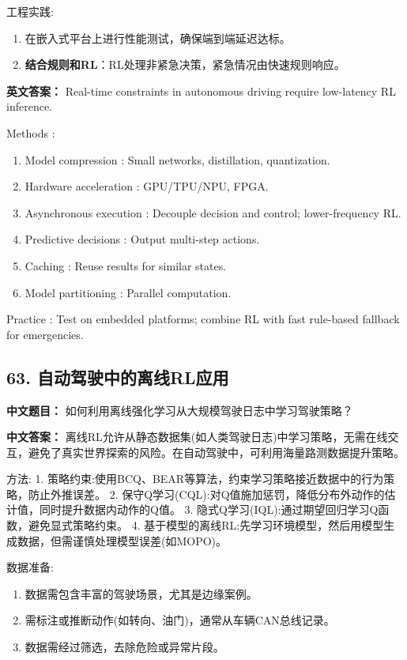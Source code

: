 \documentclass[10pt,a4paper]{ctexart}
\begin{document}
 工程实践:
\begin{enumerate}
    \item 在嵌入式平台上进行性能测试，确保端到端延迟达标。
    \item \textbf{结合规则和RL}：RL处理非紧急决策，紧急情况由快速规则响应。
\end{enumerate}

\textbf{英文答案：}  
Real-time constraints in autonomous driving require low-latency RL inference.

 Methods :
\begin{enumerate}
    \item Model compression : Small networks, distillation, quantization.
    \item Hardware acceleration : GPU/TPU/NPU, FPGA.
    \item Asynchronous execution : Decouple decision and control; lower-frequency RL.
    \item Predictive decisions : Output multi-step actions.
    \item Caching : Reuse results for similar states.
    \item Model partitioning : Parallel computation.
\end{enumerate}

 Practice : Test on embedded platforms; combine RL with fast rule-based fallback for emergencies.

\subsection*{63. 自动驾驶中的离线RL应用}
\textbf{中文题目：} 如何利用离线强化学习从大规模驾驶日志中学习驾驶策略？

\textbf{中文答案：}  
离线RL允许从静态数据集(如人类驾驶日志)中学习策略，无需在线交互，避免了真实世界探索的风险。在自动驾驶中，可利用海量路测数据提升策略。

 方法:
1.  策略约束:使用BCQ、BEAR等算法，约束学习策略接近数据中的行为策略，防止外推误差。
2.  保守Q学习(CQL):对Q值施加惩罚，降低分布外动作的估计值，同时提升数据内动作的Q值。
3.  隐式Q学习(IQL):通过期望回归学习Q函数，避免显式策略约束。
4.  基于模型的离线RL:先学习环境模型，然后用模型生成数据，但需谨慎处理模型误差(如MOPO)。

 数据准备:
\begin{enumerate}
    \item 数据需包含丰富的驾驶场景，尤其是边缘案例。
    \item 需标注或推断动作(如转向、油门)，通常从车辆CAN总线记录。
    \item 数据需经过筛选，去除危险或异常片段。
\end{enumerate}
\end{document}
